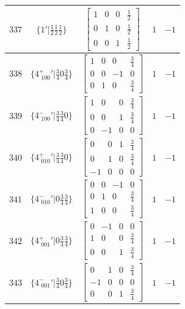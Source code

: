 \documentclass[fleqn,8pt]{jsarticle}
\begin{document}
\begin{longtable}{ccccc}
$ 337 $ & $ \{1{}'|\frac{1}{2} \frac{1}{2} \frac{1}{2}\} $ & $ \begin{bmatrix} 1 & 0 & 0 & \frac{1}{2} \\ 0 & 1 & 0 & \frac{1}{2} \\ 0 & 0 & 1 & \frac{1}{2} \end{bmatrix} $ & $ 1 $ & $ -1 $ \\ \hline
$ 338 $ & $ \{4^{+}_{\,\,100}{}'|\frac{3}{4} 0 \frac{3}{4}\} $ & $ \begin{bmatrix} 1 & 0 & 0 & \frac{3}{4} \\ 0 & 0 & -1 & 0 \\ 0 & 1 & 0 & \frac{3}{4} \end{bmatrix} $ & $ 1 $ & $ -1 $ \\ \hline
$ 339 $ & $ \{4^{-}_{\,\,100}{}'|\frac{3}{4} \frac{3}{4} 0\} $ & $ \begin{bmatrix} 1 & 0 & 0 & \frac{3}{4} \\ 0 & 0 & 1 & \frac{3}{4} \\ 0 & -1 & 0 & 0 \end{bmatrix} $ & $ 1 $ & $ -1 $ \\ \hline
$ 340 $ & $ \{4^{+}_{\,\,010}{}'|\frac{3}{4} \frac{3}{4} 0\} $ & $ \begin{bmatrix} 0 & 0 & 1 & \frac{3}{4} \\ 0 & 1 & 0 & \frac{3}{4} \\ -1 & 0 & 0 & 0 \end{bmatrix} $ & $ 1 $ & $ -1 $ \\ \hline
$ 341 $ & $ \{4^{-}_{\,\,010}{}'|0 \frac{3}{4} \frac{3}{4}\} $ & $ \begin{bmatrix} 0 & 0 & -1 & 0 \\ 0 & 1 & 0 & \frac{3}{4} \\ 1 & 0 & 0 & \frac{3}{4} \end{bmatrix} $ & $ 1 $ & $ -1 $ \\ \hline
$ 342 $ & $ \{4^{+}_{\,\,001}{}'|0 \frac{3}{4} \frac{3}{4}\} $ & $ \begin{bmatrix} 0 & -1 & 0 & 0 \\ 1 & 0 & 0 & \frac{3}{4} \\ 0 & 0 & 1 & \frac{3}{4} \end{bmatrix} $ & $ 1 $ & $ -1 $ \\ \hline
$ 343 $ & $ \{4^{-}_{\,\,001}{}'|\frac{3}{4} 0 \frac{3}{4}\} $ & $ \begin{bmatrix} 0 & 1 & 0 & \frac{3}{4} \\ -1 & 0 & 0 & 0 \\ 0 & 0 & 1 & \frac{3}{4} \end{bmatrix} $ & $ 1 $ & $ -1 $ \\ \hline

\end{longtable}
\end{document}
